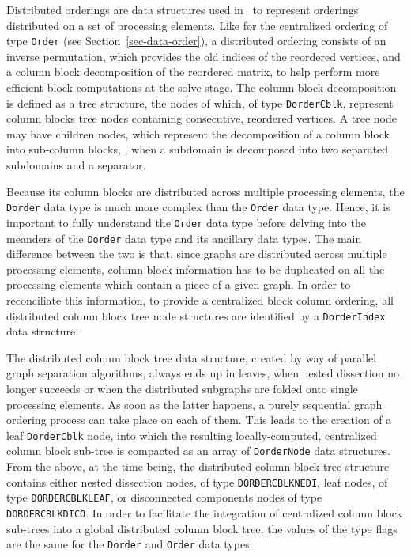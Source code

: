 Distributed orderings are data structures used in \ptscotch\ to
represent orderings distributed on a set of processing elements. Like
for the centralized ordering of type \texttt{Order} (see
Section~\ref{sec-data-order}), a distributed ordering consists of an
inverse permutation, which provides the old indices of the reordered
vertices, and a column block decomposition of the reordered matrix, to
help perform more efficient block computations at the solve stage. The
column block decomposition is defined as a tree structure, the nodes
of which, of type \texttt{Dorder\lbt Cblk}, represent column blocks
tree nodes containing consecutive, reordered vertices. A tree node may
have children nodes, which represent the decomposition of a column
block into sub-column blocks, \eg, when a subdomain is decomposed into
two separated subdomains and a separator.

Because its column blocks are distributed across multiple processing
elements, the \texttt{Dorder} data type is much more complex than
the \texttt{Order} data type. Hence, it is important to fully
understand the \texttt{Order} data type before delving into the
meanders of the \texttt{Dorder} data type and its ancillary data
types. The main difference between the two is that, since graphs are
distributed across multiple processing elements, column block
information has to be duplicated on all the processing elements
which contain a piece of a given graph. In order to reconciliate this
information, to provide a centralized block column ordering, all
distributed column block tree node structures are identified by a
\texttt{Dorder\lbt Index} data structure.

The distributed column block tree data structure, created by way of
parallel graph separation algorithms, always ends up in leaves, when
nested dissection no longer succeeds or when the distributed subgraphs
are folded onto single processing elements. As soon as the latter
happens, a purely sequential graph ordering process can take place on
each of them. This leads to the creation of a leaf
\texttt{Dorder\lbt Cblk} node, into which the resulting
locally-computed, centralized column block sub-tree is compacted as an
array of \texttt{Dorder\lbt Node} data structures. From the above, at
the time being, the distributed column block tree structure contains
either nested dissection nodes, of type \texttt{DORDER\lbt CBLK\lbt NEDI},
leaf nodes, of type \texttt{DORDER\lbt CBLK\lbt LEAF}, or disconnected
components nodes of type \texttt{DORDER\lbt CBLK\lbt DICO}.
In order to facilitate the integration of centralized column block
sub-trees into a global distributed column block tree, the values of
the type flags are the same for the \texttt{Dorder} and \texttt{Order}
data types.

